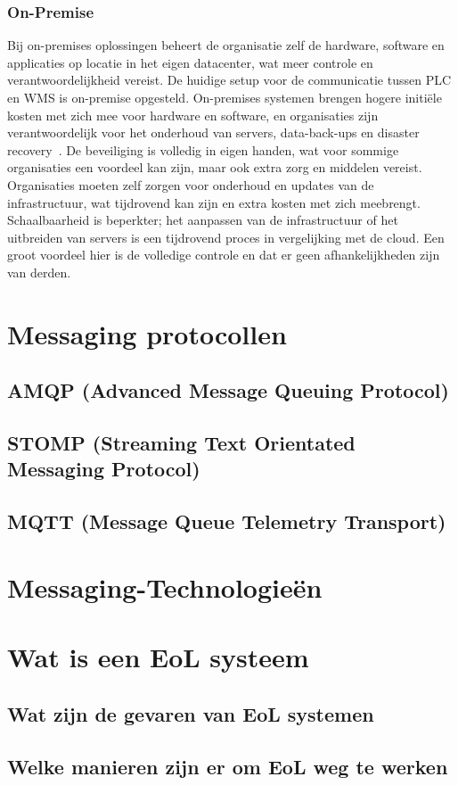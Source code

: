 \subsubsection{On-Premise}
Bij on-premises oplossingen beheert de organisatie zelf de hardware, software en applicaties op locatie in het eigen datacenter, wat meer controle en verantwoordelijkheid vereist.
De huidige setup voor de communicatie tussen PLC en WMS is on-premise opgesteld.
On-premises systemen brengen hogere initiële kosten met zich mee voor hardware en software, 
en organisaties zijn verantwoordelijk voor het onderhoud van servers, data-back-ups en disaster recovery~\autocite{Golec2021}.
De beveiliging is volledig in eigen handen, wat voor sommige organisaties een voordeel kan zijn, maar ook extra zorg en middelen vereist.
Organisaties moeten zelf zorgen voor onderhoud en updates van de infrastructuur, wat tijdrovend kan zijn en extra kosten met zich meebrengt.
Schaalbaarheid is beperkter; het aanpassen van de infrastructuur of het uitbreiden van servers is een tijdrovend proces in vergelijking met de cloud.
Een groot voordeel hier is de volledige controle en dat er geen afhankelijkheden zijn van derden.

\section{Messaging protocollen}

\subsection{AMQP (Advanced Message Queuing Protocol)} 

\subsection{STOMP (Streaming Text Orientated Messaging Protocol)}

\subsection{MQTT (Message Queue Telemetry Transport)}

\section{Messaging-Technologieën}


\section{Wat is een EoL systeem}

\subsection{Wat zijn de gevaren van EoL systemen}

\subsection{Welke manieren zijn er om EoL weg te werken}









